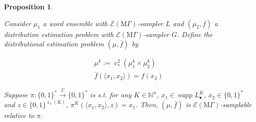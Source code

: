 \documentclass{article}
\numberwithin{equation}{section}
\theoremstyle{definition}
\theoremstyle{plain}
\newtheorem{proposition}{Proposition}[section]
\newcommand{\Bool}{\{0,1\}}
\newcommand{\Words}{{\Bool^*}}
\DeclareMathOperator{\Supp}{supp}
\DeclareMathOperator{\R}{r}
\DeclareMathOperator{\En}{c}
\newcommand{\Nats}{\mathbb{N}}
\newcommand{\Chev}[1]{\langle #1 \rangle}
\newcommand{\MGrow}{\mathrm{M}\Gamma}
\newcommand{\Fall}{\mathcal{E}}
\newcommand{\EMG}{\Fall(\MGrow)}
\newcommand{\Scheme}{\xrightarrow{\Gamma}}
\begin{document}
\begin{samepage}
\begin{proposition}
\label{prp:thm__mult__cond3}

Consider $\mu_1$ a word ensemble with $\EMG$-sampler $L$ and $(\mu_2, f)$ a distribution estimation problem with $\EMG$-sampler $G$. Define the distributional estimation problem $(\mu,\bar{f})$ by 

\begin{align*}
\mu^k:=\En_*^2(\mu_1^k \times \mu_2^k)\\
\bar{f}(\Chev{x_1,x_2})=f(x_2)
\end{align*}

Suppose $\pi: \Words \Scheme \Words$ is s.t. for any $K \in \Nats^n$, ${x_1 \in \Supp L_\bullet^{K}}$, ${x_2 \in \Words}$ and $z \in \Bool^{\R_\pi(K)}$, $\pi^{K}(\Chev{x_1,x_2},z)=x_1$. Then, $(\mu,\bar{f})$ is $\EMG$-samplable relative to $\pi$.

\end{proposition}
\end{samepage}
\end{document}
